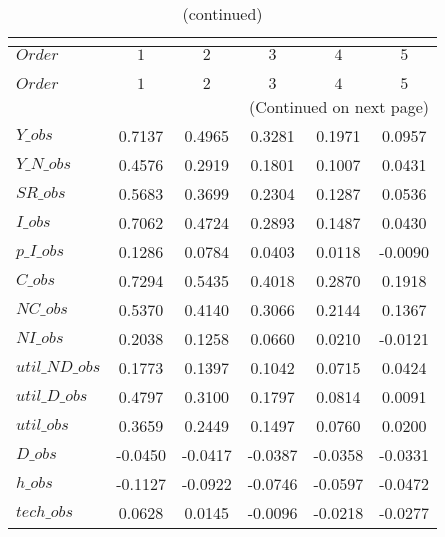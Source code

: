  
\begin{center}
\begin{longtable}{lccccc} 
\caption{COEFFICIENTS OF AUTOCORRELATION}\\
 \label{Table:th_autocorr_matrix}\\
\toprule 
$Order          $	 & 	 $          1$	 & 	 $          2$	 & 	 $          3$	 & 	 $          4$	 & 	 $          5$\\
\midrule \endfirsthead 
\caption{(continued)}\\
 \toprule \\ 
$Order          $	 & 	 $          1$	 & 	 $          2$	 & 	 $          3$	 & 	 $          4$	 & 	 $          5$\\
\midrule \endhead 
\midrule \multicolumn{6}{r}{(Continued on next page)} \\ \bottomrule \endfoot 
\bottomrule \endlastfoot 
$Y\_obs         $	 & 	     0.7137	 & 	     0.4965	 & 	     0.3281	 & 	     0.1971	 & 	     0.0957 \\ 
$Y\_N\_obs      $	 & 	     0.4576	 & 	     0.2919	 & 	     0.1801	 & 	     0.1007	 & 	     0.0431 \\ 
$SR\_obs        $	 & 	     0.5683	 & 	     0.3699	 & 	     0.2304	 & 	     0.1287	 & 	     0.0536 \\ 
$I\_obs         $	 & 	     0.7062	 & 	     0.4724	 & 	     0.2893	 & 	     0.1487	 & 	     0.0430 \\ 
$p\_I\_obs      $	 & 	     0.1286	 & 	     0.0784	 & 	     0.0403	 & 	     0.0118	 & 	    -0.0090 \\ 
$C\_obs         $	 & 	     0.7294	 & 	     0.5435	 & 	     0.4018	 & 	     0.2870	 & 	     0.1918 \\ 
$NC\_obs        $	 & 	     0.5370	 & 	     0.4140	 & 	     0.3066	 & 	     0.2144	 & 	     0.1367 \\ 
$NI\_obs        $	 & 	     0.2038	 & 	     0.1258	 & 	     0.0660	 & 	     0.0210	 & 	    -0.0121 \\ 
$util\_ND\_obs  $	 & 	     0.1773	 & 	     0.1397	 & 	     0.1042	 & 	     0.0715	 & 	     0.0424 \\ 
$util\_D\_obs   $	 & 	     0.4797	 & 	     0.3100	 & 	     0.1797	 & 	     0.0814	 & 	     0.0091 \\ 
$util\_obs      $	 & 	     0.3659	 & 	     0.2449	 & 	     0.1497	 & 	     0.0760	 & 	     0.0200 \\ 
$D\_obs         $	 & 	    -0.0450	 & 	    -0.0417	 & 	    -0.0387	 & 	    -0.0358	 & 	    -0.0331 \\ 
$h\_obs         $	 & 	    -0.1127	 & 	    -0.0922	 & 	    -0.0746	 & 	    -0.0597	 & 	    -0.0472 \\ 
$tech\_obs      $	 & 	     0.0628	 & 	     0.0145	 & 	    -0.0096	 & 	    -0.0218	 & 	    -0.0277 \\ 
\end{longtable}
 \end{center}
